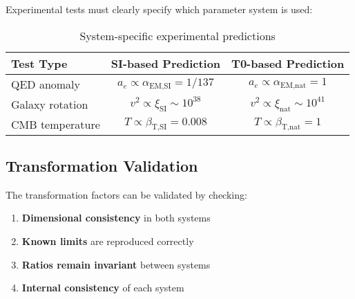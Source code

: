 \documentclass[12pt,a4paper]{article}
\newcommand{\xipar}{\xi}
\newcommand{\alphaEMSI}{\alpha_{\text{EM,SI}}}
\newcommand{\alphaEMnat}{\alpha_{\text{EM,nat}}}
\newcommand{\betaTSI}{\beta_{\text{T,SI}}}
\newcommand{\betaTnat}{\beta_{\text{T,nat}}}
\begin{document}
	Experimental tests must clearly specify which parameter system is used:
	
	\begin{table}[htbp]
		\centering
		\begin{tabular}{lcc}
			\toprule
			\textbf{Test Type} & \textbf{SI-based Prediction} & \textbf{T0-based Prediction} \\
			\midrule
			QED anomaly & $a_e \propto \alphaEMSI = 1/137$ & $a_e \propto \alphaEMnat = 1$ \\
			Galaxy rotation & $v^2 \propto \xipar_{\text{SI}} \sim 10^{38}$ & $v^2 \propto \xipar_{\text{nat}} \sim 10^{41}$ \\
			CMB temperature & $T \propto \betaTSI = 0.008$ & $T \propto \betaTnat = 1$ \\
			\bottomrule
		\end{tabular}
		\caption{System-specific experimental predictions}
		\label{tab:system_predictions}
	\end{table}
	
	\subsection{Transformation Validation}
	\label{subsec:transformation_validation}
	
	The transformation factors can be validated by checking:
	
	\begin{enumerate}
		\item \textbf{Dimensional consistency} in both systems
		\item \textbf{Known limits} are reproduced correctly
		\item \textbf{Ratios remain invariant} between systems
		\item \textbf{Internal consistency} of each system
	\end{enumerate}
	
\end{document}
